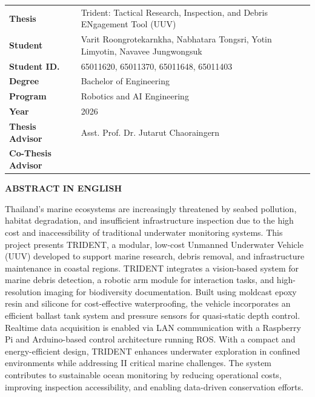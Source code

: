 \noindent
\begin{tabular}{ll}
\textbf{Thesis} & Trident: Tactical Research, Inspection, and Debris ENgagement Tool (UUV) \\
\textbf{Student} & Varit Roongrotekarnkha, Nabhatara Tongsri, Yotin Limyotin, Navavee Jungwongsuk \\
\textbf{Student ID.} & 65011620, 65011370, 65011648, 65011403 \\
\textbf{Degree} & Bachelor of Engineering \\
\textbf{Program} & Robotics and AI Engineering \\
\textbf{Year} & 2026 \\
\textbf{Thesis Advisor} & Asst. Prof. Dr. Jutarut Chaoraingern \\
\textbf{Co-Thesis Advisor} & \\
\end{tabular}

\vspace{1cm}

\begin{center}
\textbf{\Large ABSTRACT IN ENGLISH}
\end{center}

\vspace{0cm}

Thailand’s marine ecosystems are increasingly threatened by seabed pollution,
habitat degradation, and insufficient infrastructure inspection due to the high cost and
inaccessibility of traditional underwater monitoring systems. This project presents TRIDENT, a
modular, low-cost Unmanned Underwater Vehicle (UUV) developed to support marine
research, debris removal, and infrastructure maintenance in coastal regions. TRIDENT
integrates a vision-based system for marine debris detection, a robotic arm module for
interaction tasks, and high-resolution imaging for biodiversity documentation. Built using moldcast epoxy resin and silicone for cost-effective waterproofing, the vehicle incorporates an
efficient ballast tank system and pressure sensors for quasi-static depth control. Realtime data
acquisition is enabled via LAN communication with a Raspberry Pi and Arduino-based control
architecture running ROS. With a compact and energy-efficient design, TRIDENT enhances
underwater exploration in confined environments while addressing II critical marine
challenges. The system contributes to sustainable ocean monitoring by reducing operational
costs, improving inspection accessibility, and enabling data-driven conservation efforts.